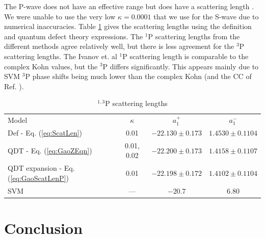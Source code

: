 \documentclass[preprint,showpacs,preprintnumbers,amsmath,amssymb,longbibliography,pra,aps]{revtex4-1}
\newcommand{\todoi}{\todo[inline]}
\begin{document}
The P-wave does not have an effective range but does have a scattering length \cite{Levy1963}. We were unable to use the very low $\kappa = 0.0001$ that we use for the S-wave due to numerical inaccuracies. Table \ref{tab:PWaveScatLen} gives the scattering lengths using the definition and quantum defect theory expressions. The $^1$P scattering lengths from the different methods agree relatively well, but there is less agreement for the $^3$P scattering lengths. The Ivanov et. al \cite{Ivanov2002} $^1$P scattering length is comparable to the complex Kohn values, but the $^3$P differs significantly. This appears mainly due to SVM $^3$P phase shifts being much lower than the complex Kohn (and the CC of Ref. \cite{Blackwood2002}).

\begin{table}[H]
\begin{center}
\begin{ruledtabular}
\begin{tabular}{l c c c}
Model & $\kappa$ & $a_1^+$ & $a_1^-$ \\
\colrule
Def - Eq. (\ref{eq:ScatLen}) & 0.01 & $-22.130 \pm 0.173$ & $1.4530 \pm 0.1104$ \\
QDT - Eq. (\ref{eq:GaoZEqn}) & 0.01, 0.02 & $-22.200 \pm 0.173$ & $1.4158 \pm 0.1107$ \\
QDT expansion - Eq. (\ref{eq:GaoScatLenP}) & 0.01 & $-22.198 \pm 0.172$ & $1.4102 \pm 0.1104$ \\
\colrule
SVM \cite{Ivanov2002} & --- & $-20.7$ & $6.80$ 
\end{tabular}
\end{ruledtabular}
\caption{$^{1,3}$P scattering lengths}
\label{tab:PWaveScatLen}
\end{center}
\end{table}






\section{Conclusion}
\end{document}
